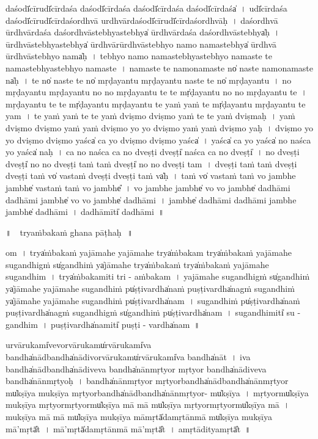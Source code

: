 \documentclass[parskip, DIV=14]{scrartcl}
\begin{document}
{daśodī̍cī॒rudī̍cī॒rdaśa॒ daśodī̍cī॒rdaśa॒ daśodī̍cī॒rdaśa॒ daśodī̍cī॒rdaśa̍~।
udī̍cī॒rdaśa॒ daśodī̍cī॒rudī̍cī॒rdaśo॒rdhvā u॒rdhvārdaśodī̍cī॒rudī̍cī॒rdaśo॒rdhvāḥ~। %
daśo॒rdhvā ū॒rdhvārdaśa॒ daśo॒rdhvāstebhya॒stebhya̍ ū॒rdhvārdaśa॒ daśo॒rdhvāstebhya̍ḥ~।
ū॒rdhvāstebhya॒stebhya̍ ū॒rdhvārū॒rdhvāstebhyo॒ namo॒ nama॒stebhya̍ ū॒rdhvā ū॒rdhvāstebhyo॒ nama̍ḥ~।
tebhyo॒ namo॒ nama॒stebhya॒stebhyo॒ nama॒ste te nama॒stebhya॒stebhyo॒ nama॒ste~।
nama॒ste te namo॒nama॒ste no̍ na॒ste namo॒nama॒ste na̍ḥ~। %
te no̍ na॒ste te no̍ mṛḍayantu mṛḍayantu na॒ste te no̍ mṛḍayantu~।
no॒ mṛ॒ḍa॒ya॒ntu॒ mṛ॒ḍa॒ya॒ntu॒ no॒ no॒ mṛ॒ḍa॒ya॒ntu॒ te te mṛ̍ḍayantu no no mṛḍayantu॒ te~।
mṛ॒ḍa॒ya॒ntu॒ te te mṛ̍ḍayantu mṛḍayantu॒ te yaṁ yaṁ te mṛ̍ḍayantu mṛḍayantu॒ te yam~।
te yaṁ yaṁ te te yaṁ dvi॒ṣmo dvi॒ṣmo yaṁ te te yaṁ dvi॒ṣmaḥ~।
yaṁ dvi॒ṣmo dvi॒ṣmo yaṁ yaṁ dvi॒ṣmo yo yo dvi॒ṣmo yaṁ yaṁ dvi॒ṣmo yaḥ~।
dvi॒ṣmo yo yo dvi॒ṣmo dvi॒ṣmo yaśca̍ ca॒ yo dvi॒ṣmo dvi॒ṣmo yaśca̍~। %
yaśca̍ ca॒ yo  yaśca̍ no naśca॒ yo  yaśca̍ naḥ~।
ca॒ no॒ na॒śca॒ ca॒ no॒ dveṣṭi॒ dveṣṭi̍ naśca ca no॒ dveṣṭi̍~।
no॒ dveṣṭi॒ dveṣṭi̍ no no॒ dveṣṭi॒ taṁ taṁ dveṣṭi̍ no no॒ dveṣṭi॒ tam~।
dveṣṭi॒ taṁ taṁ dveṣṭi॒ dveṣṭi॒ taṁ vo̍ va॒staṁ dveṣṭi॒ dveṣṭi॒ taṁ va̍ḥ~।
taṁ vo̍ va॒staṁ taṁ vo॒ jambhe॒ jambhe̍ va॒staṁ taṁ vo॒ jambhe̎~।
vo॒ jambhe॒ jambhe̍ vo vo॒ jambhe̍ dadhāmi dadhāmi॒ jambhe̍ vo vo॒ jambhe̍ dadhāmi~।
jambhe̍ dadhāmi dadhāmi॒ jambhe॒ jambhe̍ dadhāmi~।
da॒dhā॒mīti̍ dadhāmi~॥

॥\,~ tryaṁbakaṁ ghana pāṭhaḥ\,~॥\\
\vspace{0.5cm}

om~।
trya̍ṁbakaṁ yajāmahe yajāmahe॒ trya̍ṁbaka॒m
trya̍ṁbakaṁ yajāmahe suga॒ndhigṁ su̍ga॒ndhiṁ ya̍jāmahe॒ trya̍ṁbaka॒ṁ trya̍ṁbakaṁ yajāmahe
suga॒ndhim~। trya̍ṁbaka॒miti॒ tri - a॒ṁba॒ka॒m~।
ya॒jā॒ma॒he॒ su॒ga॒ndhigṁ su̍ga॒ndhiṁ ya̍jāmahe yajāmahe suga॒ndhiṁ pu̍ṣṭi॒vardha̍naṁ puṣṭi॒vardha̍nagṁ
suga॒ndhiṁ ya̍jāmahe yajāmahe suga॒ndhiṁ pu̍ṣṭi॒vardha̍nam~।
su॒ga॒ndhiṁ pu̍ṣṭi॒vardha̍naṁ puṣṭi॒vardha̍nagṁ suga॒ndhigṁ su̍ga॒ndhiṁ pu̍ṣṭi॒vardha̍nam~।
su॒ga॒ndhimiti̍ su - ga॒ndhim~। pu॒ṣṭi॒vardha̍na॒miti̍ puṣṭi - vardha̍nam~॥ 

u॒rvā॒ru॒kami̍vevorvāru॒kamu̍rvāru॒kami̍va॒
bandha̍nā॒dbandha̍nādivorvāru॒kamu̍rvāru॒kami̍va॒ bandha̍nāt~।
i॒va॒ bandha̍nā॒dbandha̍nādiveva॒ bandha̍nānmṛ॒tyor mṛ॒tyor bandha̍nādiveva॒ bandha̍nānmṛ॒tyoḥ~।
bandha̍nānmṛ॒tyor mṛ॒tyorbandha̍nā॒dbandha̍nānmṛ॒tyor mu̍kṣīya mukṣīya
mṛ॒tyorbandha̍nā॒dbandha̍nānmṛ॒tyor- mu̍kṣīya~।
mṛ॒tyormu̍kṣīya mukṣīya mṛ॒tyormṛ॒tyormu̍kṣīya॒ mā mā mu̍kṣīya mṛ॒tyormṛ॒tyormu̍kṣīya॒ mā~।
mu॒kṣī॒ya॒ mā mā mu̍kṣīya mukṣīya॒ māmṛtā̍da॒mṛtā॒nmā mu̍kṣīya mukṣīya॒ mā'mṛtā̎t~।
mā'mṛtā̍da॒mṛtā॒nmā mā'mṛtā̎t~। a॒mṛtā॒ditya॒mṛtā̎t~॥

}
\end{document}
